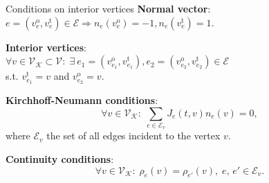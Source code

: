 \documentclass[9pt]{beamer}
\begin{document}
\begin{frame}{Conditions on interior vertices}
    \textbf{Normal vector}: \\
    $e = \left( v^{\operatorname{o}}_e, v^{\operatorname{t}}_e \right) \in \mathcal{E} \Rightarrow n_e \left( v^{\operatorname{o}}_e \right)  = -1, n_e \left( v^{\operatorname{t}}_e \right)  = 1$. \\

    \vspace{3mm} 

    \textbf{Interior vertices}: \\
    $\forall v \in \mathcal{V}_\mathcal{K} \subset \mathcal{V} \colon \; \exists \ e_1 = \left( v^{\operatorname{o}}_{e_1}, v^{\operatorname{t}}_{e_1} \right), e_2 = \left( v^{\operatorname{o}}_{e_2}, v^{\operatorname{t}}_{e_2} \right) \in \mathcal{E}$ \\ s.t. $v^{\operatorname{t}}_{e_1} = v$ and $v^{\operatorname{o}}_{e_2} = v$. \\

    \vspace{3mm} 

    \textbf{Kirchhoff-Neumann conditions}:
    \begin{equation*}
        \forall v \in \mathcal{V}_\mathcal{K} \colon \; \sum_{e\in \mathcal{E}_v} J_e \left( t,v \right)  n_e  \left( v \right) =0,
    \end{equation*}
    where $\mathcal{E}_v$ the set of all edges incident to the vertex $v$. \\

    \vspace{3mm}

    \textbf{Continuity conditions}:
    \begin{equation*}
        \forall v \in \mathcal{V}_\mathcal{K} \colon \; \rho_e \left( v \right)  = \rho_{e'} \left( v \right), \; e,\,e' \in \mathcal{E}_v.
    \end{equation*}
\end{frame}
\end{document}
